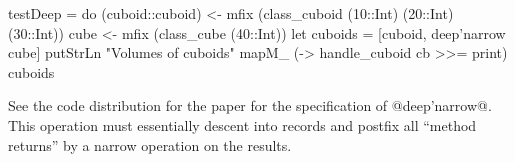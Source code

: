 \begin{code}
 testDeep
   = do
	(cuboid::cuboid) <- mfix (class_cuboid (10::Int) (20::Int) (30::Int))
	cube <- mfix (class_cube (40::Int))
	let cuboids = [cuboid, deep'narrow cube]
	putStrLn "Volumes of cuboids"
        mapM_ (\cb -> handle_cuboid cb >>= print) cuboids
\end{code}

\noindent


\noindent
See the code distribution for the paper for the specification of
@deep'narrow@. This operation must essentially descent into records
and postfix all ``method returns'' by a narrow operation on the
results.



